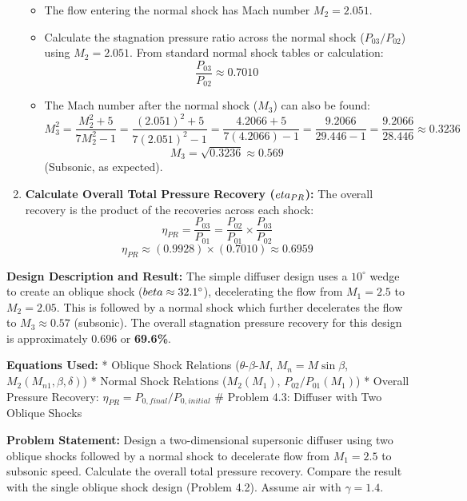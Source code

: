 \begin{enumerate}
  \begin{itemize}
  \tightlist
  \item
    The flow entering the normal shock has Mach number \(M_2 = 2.051\).
  \item
    Calculate the stagnation pressure ratio across the normal shock
    (\(P_{03}/P_{02}\)) using \(M_2=2.051\). From standard normal shock
    tables or calculation: \[ \frac{P_{03}}{P_{02}} \approx 0.7010 \]
  \item
    The Mach number after the normal shock (\(M_3\)) can also be found:
    \[ M_3^2 = \frac{M_2^2 + 5}{7M_2^2 - 1} = \frac{(2.051)^2 + 5}{7(2.051)^2 - 1} = \frac{4.2066 + 5}{7(4.2066) - 1} = \frac{9.2066}{29.446 - 1} = \frac{9.2066}{28.446} \approx 0.3236 \]
    \[ M_3 = \sqrt{0.3236} \approx 0.569 \] (Subsonic, as expected).
  \end{itemize}
\item
  \textbf{Calculate Overall Total Pressure Recovery (\(\\eta_{PR}\)):}
  The overall recovery is the product of the recoveries across each
  shock:
  \[ \eta_{PR} = \frac{P_{03}}{P_{01}} = \frac{P_{02}}{P_{01}} \times \frac{P_{03}}{P_{02}} \]
  \[ \eta_{PR} \approx (0.9928) \times (0.7010) \approx 0.6959 \]
\end{enumerate}

\textbf{Design Description and Result:} The simple diffuser design uses
a \(10^\circ\) wedge to create an oblique shock
(\(\\beta \approx 32.1^\circ\)), decelerating the flow from \(M_1=2.5\)
to \(M_2=2.05\). This is followed by a normal shock which further
decelerates the flow to \(M_3 \approx 0.57\) (subsonic). The overall
stagnation pressure recovery for this design is approximately
\(\mathbf{0.696}\) or \textbf{69.6\%}.

\textbf{Equations Used:} * Oblique Shock Relations
(\(\theta\)-\(\beta\)-\(M\), \(M_n = M \sin\beta\),
\(M_2(M_{n1}, \beta, \delta)\)) * Normal Shock Relations (\(M_2(M_1)\),
\(P_{02}/P_{01}(M_1)\)) * Overall Pressure Recovery:
\(\eta_{PR} = P_{0, final}/P_{0, initial}\) \# Problem 4.3: Diffuser
with Two Oblique Shocks

\textbf{Problem Statement:} Design a two-dimensional supersonic diffuser
using two oblique shocks followed by a normal shock to decelerate flow
from \(M_1=2.5\) to subsonic speed. Calculate the overall total pressure
recovery. Compare the result with the single oblique shock design
(Problem 4.2). Assume air with \(\gamma = 1.4\).

